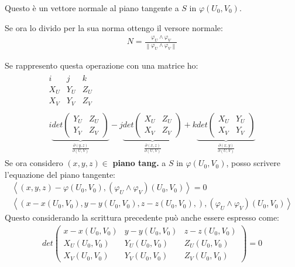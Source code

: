\documentclass[a4paper, oneside]{article}
\begin{document}
Questo è un vettore normale al piano tangente a $S$ in $\varphi(U_0, V_0)$.\\
\begin{definition}
    Se ora lo divido per la sua norma ottengo il versore normale:
    \begin{gather*}
      N = \frac{\varphi_U \land \varphi_V}{\left\lVert \varphi_U \land \varphi_V \right\rVert }
    \end{gather*}
\end{definition}
Se rappresento questa operazione con una matrice ho:
\begin{gather*}
  \begin{matrix}
    i & j & k\\
    X_U & Y_U & Z_U\\
    X_V & Y_V & Z_V
  \end{matrix}\\
  \begin{matrix}
    i \underbrace{det\begin{pmatrix}
      Y_U & Z_U\\
      Y_V & Z_V
    \end{pmatrix}}_{\frac{\partial (y,z)}{\partial (U,V)}}   - j \underbrace{det\begin{pmatrix}
      X_U & Z_U\\
      X_V & Z_V
    \end{pmatrix}}_{\frac{\partial (x,z)}{\partial (U,V)}} + k \underbrace{det\begin{pmatrix}
      X_U & Y_U\\
      X_V & Y_V
    \end{pmatrix}}_{\frac{\partial (x,y)}{\partial (U,V)}}
  \end{matrix}
\end{gather*}
Se ora considero $(x,y,z) \in$ \textbf{piano tang.} a $S$ in $\varphi(U_0, V_0)$, posso scrivere l'equazione del piano tangente:
\begin{gather*}
  \left\langle (x,y,z) - \varphi(U_0, V_0) , (\varphi_U \land \varphi_V)(U_0, V_0)\right\rangle = 0\\
  \left\langle \left(x-x(U_0,V_0), y-y(U_0,V_0), z-z(U_0,V_0),\right) , (\varphi_U \land \varphi_V)(U_0, V_0)  \right\rangle 
\end{gather*} 
Questo considerando la scrittura precedente può anche essere espresso come:
\begin{gather*}
  det \begin{pmatrix}
    x - x(U_0,V_0) & y - y(U_0,V_0) & z - z(U_0,V_0)\\
    X_U(U_0,V_0) & Y_U(U_0,V_0) & Z_U(U_0,V_0)\\
    X_V(U_0,V_0) & Y_V(U_0,V_0) & Z_V(U_0,V_0)
  \end{pmatrix} = 0
\end{gather*}
\end{document}
